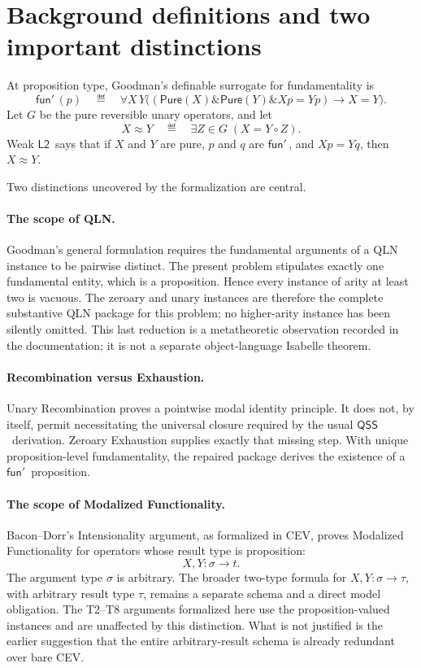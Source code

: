 \documentclass[12pt,leqno]{article}
\newcommand{\AND}{\ensuremath{\mathbin{\&}}}
\newcommand{\IC}{\ensuremath{\rightarrow}}
\theoremstyle{plain}
\theoremstyle{definition}
\newcommand{\funp}{\ensuremath{\mathsf{fun}'\,}}
\newcommand{\Pure}{\ensuremath{\mathsf{Pure}}}
\newcommand{\Ltwo}{\ensuremath{\mathsf{L2}}}
\newcommand{\QSS}{\ensuremath{\mathsf{QSS}}}
\begin{document}
\section{Background definitions and two important distinctions}

At proposition type, Goodman's definable surrogate for fundamentality is
\[
 \funp(p)
 \quad\eqdef\quad
 \forall X\,Y\bigl((\Pure(X)\AND\Pure(Y)\AND Xp=Yp)\IC X=Y\bigr).
\]
Let \(G\) be the pure reversible unary operators, and let
\[
 X\approx Y
 \quad\eqdef\quad
 \exists Z\in G\;(X=Y\circ Z).
\]
Weak \Ltwo\ says that if \(X\) and \(Y\) are pure, \(p\) and \(q\) are
\(\funp\), and \(Xp=Yq\), then \(X\approx Y\).

Two distinctions uncovered by the formalization are central.

\paragraph{The scope of QLN.}
Goodman's general formulation requires the fundamental arguments of a QLN
instance to be pairwise distinct.  The present problem stipulates exactly one
fundamental entity, which is a proposition.  Hence every instance of arity at
least two is vacuous.  The zeroary and unary instances are therefore the
complete substantive QLN package for this problem; no higher-arity instance
has been silently omitted.  This last reduction is a metatheoretic
observation recorded in the documentation; it is not a separate
object-language Isabelle theorem.

\paragraph{Recombination versus Exhaustion.}
Unary Recombination proves a pointwise modal identity principle.  It does not,
by itself, permit necessitating the universal closure required by the usual
\QSS\ derivation.  Zeroary Exhaustion supplies exactly that missing step.  With
unique proposition-level fundamentality, the repaired package derives the
existence of a \(\funp\) proposition.

\paragraph{The scope of Modalized Functionality.}
Bacon--Dorr's Intensionality argument, as formalized in CEV, proves
Modalized Functionality for operators whose result type is proposition:
\[
 X,Y:\sigma\to t.
\]
The argument type \(\sigma\) is arbitrary.  The broader two-type formula for
\(X,Y:\sigma\to\tau\), with arbitrary result type \(\tau\), remains a
separate schema and a direct model obligation.  The T2--T8 arguments
formalized here use the proposition-valued instances and are unaffected by
this distinction.  What is not justified is the earlier suggestion that the
entire arbitrary-result schema is already redundant over bare CEV.
\end{document}
